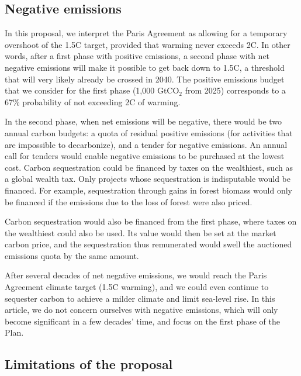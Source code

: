 \documentclass[12pt,english]{article}
\begin{document}
\subsection{Negative emissions\label{subsec:negative_emissions}}

In this proposal, we interpret the Paris Agreement as allowing for a temporary overshoot of the 1.5\textdegree{}C target, provided that warming never exceeds 2\textdegree{}C. In other words, after a first phase with positive emissions, a second phase with net negative emissions will make it possible to get back down to 1.5\textdegree{}C, a threshold that will very likely already be crossed in 2040.\citep{diffenbaugh_data-driven_2023} 
The positive emissions budget that we consider for the first phase (1,000 GtCO$_\text{2}$ from 2025) corresponds to a 67\% probability of not exceeding 2\textdegree{}C of warming. 

In the second phase, when net emissions will be negative, there would be two annual carbon budgets: a quota of residual positive emissions (for activities that are impossible to decarbonize), and a tender for negative emissions. An annual call for tenders would enable negative emissions to be purchased at the lowest cost. Carbon sequestration could be financed by taxes on the wealthiest, such as a global wealth tax. Only projects whose sequestration is indisputable would be financed. For example, sequestration through gains in forest biomass would only be financed if the emissions due to the loss of forest were also priced. 

Carbon sequestration would also be financed from the first phase, where taxes on the wealthiest could also be used. Its value would then be set at the market carbon price, and the sequestration thus remunerated would swell the auctioned emissions quota by the same amount.\citep{edenhofer_governance_2023} 

After several decades of net negative emissions, we would reach the Paris Agreement climate target (1.5\textdegree{}C warming), and we could even continue to sequester carbon to achieve a milder climate and limit sea-level rise. In this article, we do not concern ourselves with negative emissions, which will only become significant in a few decades' time, and focus on the first phase of the Plan. 


\subsection{Limitations of the proposal\label{subsec:limitation}}
\end{document}
